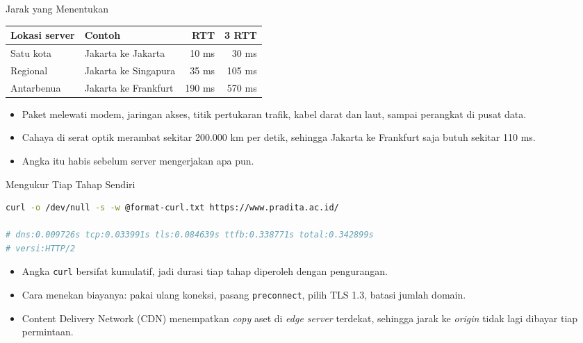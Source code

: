 \documentclass[aspectratio=169, table, 12pt]{beamer}
\begin{document}
\begin{frame}{{\Large Jarak yang Menentukan}}
  \vspace{5pt}
  \centering
  {\small
  \begin{tabularx}{0.9\textwidth}{lXrr}
    \hline
    \textbf{Lokasi server} & \textbf{Contoh} & \textbf{RTT} & \textbf{3 RTT} \\
    \hline
    Satu kota  & Jakarta ke Jakarta   & 10 ms  & 30 ms  \\
    \hline
    Regional   & Jakarta ke Singapura & 35 ms  & 105 ms \\
    \hline
    Antarbenua & Jakarta ke Frankfurt & 190 ms & 570 ms \\
    \hline
  \end{tabularx}}

  \vspace{10pt}
  \begin{itemize}
    \item Paket melewati modem, jaringan akses, titik pertukaran trafik,
          kabel darat dan laut, sampai perangkat di pusat data.
    \item Cahaya di serat optik merambat sekitar 200.000 km per detik,
          sehingga Jakarta ke Frankfurt saja butuh sekitar 110 ms.
    \item Angka itu habis sebelum server mengerjakan apa pun.
  \end{itemize}
\end{frame}

\begin{frame}[fragile]{{\Large Mengukur Tiap Tahap Sendiri}}
  \vspace{5pt}
\begin{lstlisting}[language=bash]
curl -o /dev/null -s -w @format-curl.txt https://www.pradita.ac.id/

# dns:0.009726s tcp:0.033991s tls:0.084639s ttfb:0.338771s total:0.342899s
# versi:HTTP/2
\end{lstlisting}

  \vspace{5pt}
  \begin{itemize}
    \item Angka \texttt{curl} bersifat kumulatif, jadi durasi tiap tahap
          diperoleh dengan pengurangan.
    \item Cara menekan biayanya: pakai ulang koneksi, pasang
          \texttt{preconnect}, pilih TLS 1.3, batasi jumlah domain.
    \item Content Delivery Network (CDN) menempatkan \textit{copy} aset di \textit{edge server} terdekat,
          sehingga jarak ke \textit{origin} tidak lagi dibayar tiap permintaan.
  \end{itemize}
\end{frame}
\end{document}
